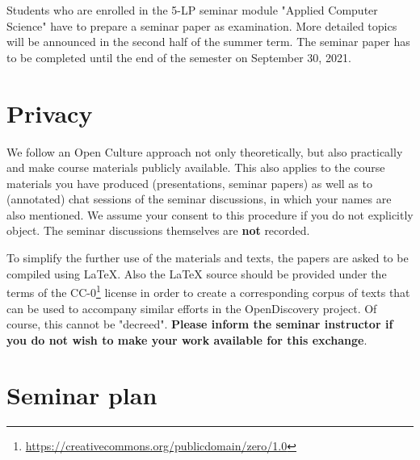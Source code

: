 \documentclass[11pt,a4paper]{article}
\begin{document}
Students who are enrolled in the 5-LP seminar module "Applied Computer
Science" have to prepare a seminar paper as examination.  More detailed topics
will be announced in the second half of the summer term. The seminar paper has
to be completed until the end of the semester on September 30, 2021.

\section{Privacy}

We follow an Open Culture approach not only theoretically, but also
practically and make course materials publicly available.  This also applies
to the course materials you have produced (presentations, seminar papers) as
well as to (annotated) chat sessions of the seminar discussions, in which your
names are also mentioned.  We assume your consent to this procedure if you do
not explicitly object.  The seminar discussions themselves are \textbf{not}
recorded.

To simplify the further use of the materials and texts, the papers are asked
to be compiled using {\LaTeX}.  Also the {\LaTeX} source should be provided
under the terms of the
CC-0\footnote{\url{https://creativecommons.org/publicdomain/zero/1.0}} license
in order to create a corresponding corpus of texts that can be used to
accompany similar efforts in the OpenDiscovery project. Of course, this cannot
be "decreed". \textbf{Please inform the seminar instructor if you do not
  wish to make your work available for this exchange}.

\section{Seminar plan}
\end{document}
